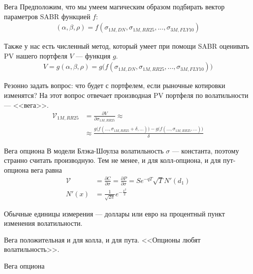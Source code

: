 \documentclass{beamer}
\begin{document}
\begin{frame}{Вега}
\justify
Предположим, что мы умеем магическим образом подбирать вектор параметров SABR функцией $f$:
\begin{align*}
(\alpha, \beta, \rho) = f(\sigma_{1M,DN}, \sigma_{1M,RR25}, ..., \sigma_{3M,FLY10})
\end{align*}

\justify
Также у нас есть численный метод, который умеет при помощи SABR оценивать PV нашего портфеля $V$ --- функция $g$.
\begin{align*}
V = g(\alpha, \beta, \rho) = g\Big(f(\sigma_{1M,DN}, \sigma_{1M,RR25}, ..., \sigma_{3M,FLY10})\Big)
\end{align*}

\justify
Резонно задать вопрос: что будет с портфелем, если рыночные котировки изменятся? На этот вопрос отвечает производная PV портфеля по волатильности --- <<вега>>.
\begin{align*}
\mathcal{V}_{1M,RR25} &= \frac{\partial V}{\partial \sigma_{1M,RR25}} \approx \\
&\approx \frac{g\Big(f(...,\sigma_{1M,RR25}+\delta,...)\Big) - g\Big(f(...,\sigma_{1M,RR25},...)\Big)}{\delta}
\end{align*}
\end{frame}



\begin{frame}{Вега опциона}
\justify
В модели Блэка-Шоулза волатильность $\sigma$ --- константа, поэтому странно считать производную. Тем не менее, и для колл-опциона, и для пут-опциона вега равна
\begin{align*}
\mathcal{V} &= \frac{\partial C}{\partial \sigma} = \frac{\partial P}{\partial \sigma} = Se^{-qT}\sqrt{T}N'(d_1) \\
N'(x) &= \frac{1}{\sqrt{2\pi}}e^{-\frac{x^2}{2}}
\end{align*}

\justify
Обычные единицы измерения --- доллары или евро на процентный пункт изменения волатильности.

\justify
Вега положительная и для колла, и для пута. <<Опционы любят волатильность>>.
\end{frame}



\begin{frame}{Вега опциона}
\centering
{}
\end{frame}
\end{document}
